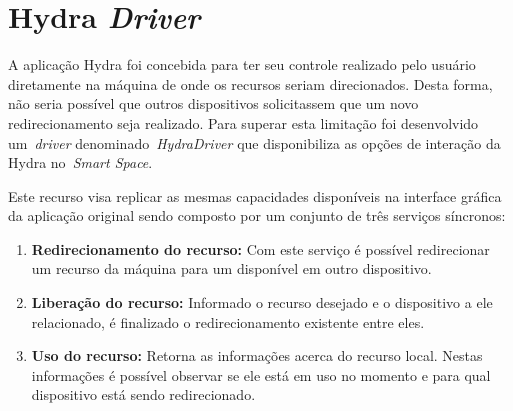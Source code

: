 \section{Hydra \textit{Driver}}
\label{sec:hydradriver}

	A aplicação Hydra foi concebida para ter seu controle realizado pelo usuário diretamente na máquina de 
	onde os recursos seriam direcionados. Desta forma, não seria possível que outros dispositivos solicitassem 
	que um novo redirecionamento seja realizado. Para superar esta limitação foi desenvolvido um~\textit{driver} 
	denominado~\textit{HydraDriver} que disponibiliza as opções de interação da Hydra no~\textit{Smart Space}.
	
	Este recurso visa replicar as mesmas capacidades disponíveis na interface gráfica da aplicação original 
	sendo composto por um conjunto de três serviços síncronos:
	
	\begin{enumerate}
	  \item \textbf{Redirecionamento do recurso:} Com este serviço é possível redirecionar um recurso da 
	  	máquina para um disponível em outro dispositivo.
	  
	  \item \textbf{Liberação do recurso:} Informado o recurso desejado e o dispositivo a ele relacionado, 
	  	é finalizado o redirecionamento existente entre eles.
	  
	  \item \textbf{Uso do recurso:} Retorna as informações acerca do recurso local. Nestas informações 
	  	é possível observar se ele está em uso no momento e para qual dispositivo está sendo redirecionado.
	  
	\end{enumerate}	
	
